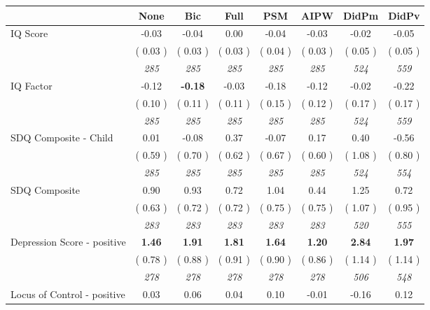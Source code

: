 \begin{tabular}{l c c c c c c c}
\toprule
 & None & Bic & Full & PSM & AIPW & DidPm & DidPv \\
\midrule
IQ Score &     -0.03 &     -0.04 &      0.00 &     -0.04 &     -0.03 &     -0.02 &     -0.05 \\
& (     0.03 ) & (     0.03 ) & (     0.03 ) & (     0.04 ) & (     0.03 ) & (     0.05 ) & (     0.05 ) \\
& \textit{ 285 } & \textit{ 285 } & \textit{ 285 } & \textit{ 285 } & \textit{ 285 } & \textit{ 524 } & \textit{ 559 } \\
IQ Factor &     -0.12 & \textbf{     -0.18 } &     -0.03 &     -0.18 &     -0.12 &     -0.02 &     -0.22 \\
& (     0.10 ) & (     0.11 ) & (     0.11 ) & (     0.15 ) & (     0.12 ) & (     0.17 ) & (     0.17 ) \\
& \textit{ 285 } & \textit{ 285 } & \textit{ 285 } & \textit{ 285 } & \textit{ 285 } & \textit{ 524 } & \textit{ 559 } \\
SDQ Composite - Child &      0.01 &     -0.08 &      0.37 &     -0.07 &      0.17 &      0.40 &     -0.56 \\
& (     0.59 ) & (     0.70 ) & (     0.62 ) & (     0.67 ) & (     0.60 ) & (     1.08 ) & (     0.80 ) \\
& \textit{ 285 } & \textit{ 285 } & \textit{ 285 } & \textit{ 285 } & \textit{ 285 } & \textit{ 524 } & \textit{ 554 } \\
SDQ Composite &      0.90 &      0.93 &      0.72 &      1.04 &      0.44 &      1.25 &      0.72 \\
& (     0.63 ) & (     0.72 ) & (     0.72 ) & (     0.75 ) & (     0.75 ) & (     1.07 ) & (     0.95 ) \\
& \textit{ 283 } & \textit{ 283 } & \textit{ 283 } & \textit{ 283 } & \textit{ 283 } & \textit{ 520 } & \textit{ 555 } \\
Depression Score - positive & \textbf{      1.46 } & \textbf{      1.91 } & \textbf{      1.81 } & \textbf{     1.64} & \textbf{     1.20} & \textbf{      2.84 } & \textbf{      1.97 } \\
& (     0.78 ) & (     0.88 ) & (     0.91 ) & (     0.90 ) & (     0.86 ) & (     1.14 ) & (     1.14 ) \\
& \textit{ 278 } & \textit{ 278 } & \textit{ 278 } & \textit{ 278 } & \textit{ 278 } & \textit{ 506 } & \textit{ 548 } \\
Locus of Control - positive &      0.03 &      0.06 &      0.04 &      0.10 &     -0.01 &     -0.16 &      0.12 \\

\end{tabular}
